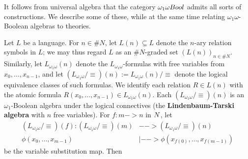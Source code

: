 \documentclass[11pt]{article}
\newcommand*\defn{\textbf}
\begin{document}
It follows from universal algebra that the category $\*{\omega_1\omega Bool}$ admits all sorts of constructions.  We describe some of these, while at the same time relating $\omega_1\omega$-Boolean algebras to theories.

Let $L$ be a language.  For $n \in \#N$, let $L(n) \subseteq L$ denote the $n$-ary relation symbols in $L$; we may thus regard $L$ as an $\#N$-graded set $(L(n))_{n \in \#N}$.  Similarly, let $L_{\omega_1\omega}(n)$ denote the $L_{\omega_1\omega}$-formulas with free variables from $x_0, \dotsc, x_{n-1}$, and let $(L_{\omega_1\omega}/{\equiv})(n) := L_{\omega_1\omega}(n)/{\equiv}$ denote the logical equivalence classes of such formulas.  We identify each relation $R \in L(n)$ with the atomic formula $R(x_0, \dotsc, x_{n-1}) \in L_{\omega_1\omega}(n)$.  Each $(L_{\omega_1\omega}/{\equiv})(n)$ is an $\omega_1$-Boolean algebra under the logical connectives (the \defn{Lindenbaum-Tarski algebra} with $n$ free variables).  For $f : m -> n$ in $\*N$, let
\begin{align*}
(L_{\omega_1\omega}/{\equiv})(f) : (L_{\omega_1\omega}/{\equiv})(m) &--> (L_{\omega_1\omega}/{\equiv})(n) \\
\phi(x_0, \dotsc, x_{m-1}) &|--> \phi(x_{f(0)}, \dotsc, x_{f(m-1)})
\end{align*}
be the variable substitution map.  Then
\end{document}
